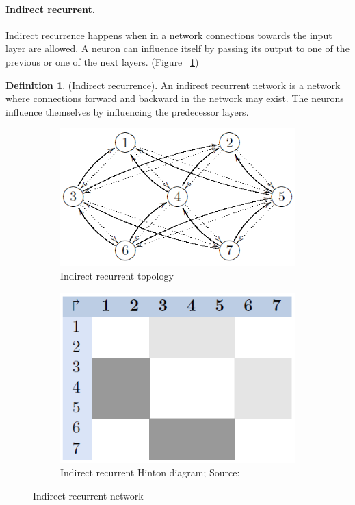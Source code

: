 \documentclass[pdftex,a4paper,12pt,twoside]{report}
\theoremstyle{plain} \newtheorem{theorem}{Theorem} \newtheorem{proposition}{Proposition} \newtheorem{lemma}{Lemma} \newtheorem*{corollary}{Corollary}
\theoremstyle{definition} \newtheorem{definition}{Definition} \newtheorem{conjecture}{Conjecture} \newtheorem*{example}{Example} \newtheorem{algorithm}{Algorithm}
\theoremstyle{remark} \newtheorem*{remark}{Remark} \newtheorem*{note}{Note} \newtheorem{case}{Case}
\begin{document}
\paragraph{Indirect recurrent.}
Indirect recurrence happens when in a network connections towards the input layer are allowed. A neuron can influence itself by passing its output to one of the previous or one of the next layers. (Figure ~\ref{fig:inderectrecurrence})
\begin{definition}
(Indirect recurrence). An indirect recurrent network is a network where connections forward and backward in the network may exist. The neurons influence themselves by influencing the predecessor layers.
\end{definition}
\begin{figure}
\centering
	\begin{subfigure}[b]{0.49\textwidth}
	\centering
	\includegraphics[width=\textwidth]{./img/recurrent-indirect-Topology.png}
	\caption{Indirect recurrent topology}
	\end{subfigure}
	\begin{subfigure}[b]{0.49\textwidth}
	\centering
	\includegraphics[width=\textwidth]{./img/recurrent-indirect-Hinton.png}
	\caption{Indirect recurrent Hinton diagram; Source:\citep{Kriesel2013}}
	\end{subfigure}
\caption{Indirect recurrent network}
\label{fig:inderectrecurrence}
\end{figure}
\end{document}
